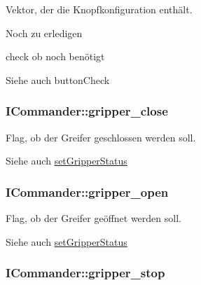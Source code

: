 Vektor, der die Knopfkonfiguration enthält. 

\begin{DoxyRefDesc}{Noch zu erledigen}
\item[\hyperlink{todo__todo000004}{Noch zu erledigen}]check ob noch benötigt \begin{DoxySeeAlso}{Siehe auch}
button\-Check 
\end{DoxySeeAlso}
\end{DoxyRefDesc}
\hypertarget{classICommander_abe4d559901acda2eb5ac159be812b85e}{
\subsubsection[{gripper\-\_\-close}]{\setlength{\rightskip}{0pt plus 5cm}I\-Commander\-::gripper\-\_\-close\hspace{0.3cm}{\ttfamily [protected]}}}\label{classICommander_abe4d559901acda2eb5ac159be812b85e}


Flag, ob der Greifer geschlossen werden soll. 

\begin{DoxySeeAlso}{Siehe auch}
\hyperlink{classICommander_a8a9f1636cbe5526d490266be84e6a57f}{set\-Gripper\-Status} 
\end{DoxySeeAlso}
\hypertarget{classICommander_aa9a42ff9cb09194140ae0da24399a41f}{
\subsubsection[{gripper\-\_\-open}]{\setlength{\rightskip}{0pt plus 5cm}I\-Commander\-::gripper\-\_\-open\hspace{0.3cm}{\ttfamily [protected]}}}\label{classICommander_aa9a42ff9cb09194140ae0da24399a41f}


Flag, ob der Greifer geöffnet werden soll. 

\begin{DoxySeeAlso}{Siehe auch}
\hyperlink{classICommander_a8a9f1636cbe5526d490266be84e6a57f}{set\-Gripper\-Status} 
\end{DoxySeeAlso}
\hypertarget{classICommander_a1b8886169747ff21c2bab443e1e10eb2}{
\subsubsection[{gripper\-\_\-stop}]{\setlength{\rightskip}{0pt plus 5cm}I\-Commander\-::gripper\-\_\-stop\hspace{0.3cm}{\ttfamily [protected]}}}\label{classICommander_a1b8886169747ff21c2bab443e1e10eb2}


